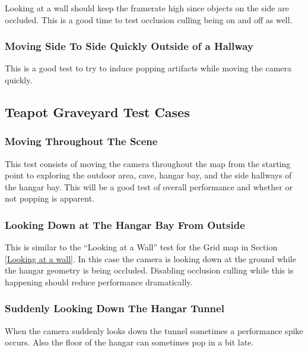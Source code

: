 \documentclass[12pt]{ucthesis}
\begin{document}
Looking at a wall should keep the framerate high since objects on the side are occluded.
This is a good time to test occlusion culling being on and off as well.

\subsubsection{Moving Side To Side Quickly Outside of a Hallway}
\label{Moving Side To Side Quickly Outside of a Hallway}

This is a good test to try to induce popping artifacts while moving the camera quickly.

\subsection{Teapot Graveyard Test Cases}
\label{graveyard-test-cases}

\subsubsection{Moving Throughout The Scene}
\label{graveyard-moving-throught-the-scene}

This test consists of moving the camera throughout the map from the starting point to exploring the outdoor area, cave, hangar bay, and the side hallways of the hangar bay.
This will be a good test of overall performance and whether or not popping is apparent.

\subsubsection{Looking Down at The Hangar Bay From Outside}
\label{Looking Down at The Hangar Bay From Outside}

This is similar to the ``Looking at a Wall'' test for the Grid map in Section \ref{Looking at a wall}.
In this case the camera is looking down at the ground while the hangar geometry is being occluded.
Disabling occlusion culling while this is happening should reduce performance dramatically.

\subsubsection{Suddenly Looking Down The Hangar Tunnel}
\label{suddenly-looking-down-the-hangar-tunnel}

When the camera suddenly looks down the tunnel sometimes a performance spike occurs.
Also the floor of the hangar can sometimes pop in a bit late.
\end{document}
